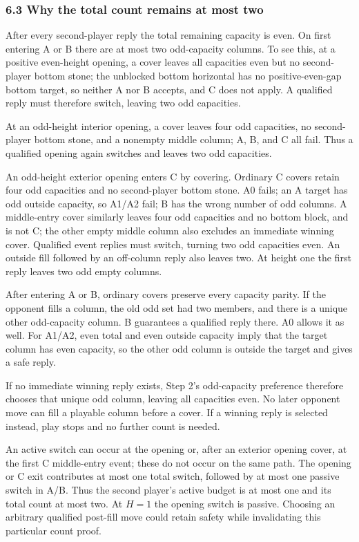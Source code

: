 \documentclass[
  a4paper,
]{article}
\newcounter{none} %
\begin{document}
\subsubsection{6.3 Why the total count remains at most
two}\label{why-the-total-count-remains-at-most-two}

After every second-player reply the total remaining capacity is even. On
first entering A or B there are at most two odd-capacity columns. To see
this, at a positive even-height opening, a cover leaves all capacities
even but no second-player bottom stone; the unblocked bottom horizontal
has no positive-even-gap bottom target, so neither A nor B accepts, and
C does not apply. A qualified reply must therefore switch, leaving two
odd capacities.

At an odd-height interior opening, a cover leaves four odd capacities,
no second-player bottom stone, and a nonempty middle column; A, B, and C
all fail. Thus a qualified opening again switches and leaves two odd
capacities.

An odd-height exterior opening enters C by covering. Ordinary C covers
retain four odd capacities and no second-player bottom stone. A0 fails;
an A target has odd outside capacity, so A1/A2 fail; B has the wrong
number of odd columns. A middle-entry cover similarly leaves four odd
capacities and no bottom block, and is not C; the other empty middle
column also excludes an immediate winning cover. Qualified event replies
must switch, turning two odd capacities even. An outside fill followed
by an off-column reply also leaves two. At height one the first reply
leaves two odd empty columns.

After entering A or B, ordinary covers preserve every capacity parity.
If the opponent fills a column, the old odd set had two members, and
there is a unique other odd-capacity column. B guarantees a qualified
reply there. A0 allows it as well. For A1/A2, even total and even
outside capacity imply that the target column has even capacity, so the
other odd column is outside the target and gives a safe reply.

If no immediate winning reply exists, Step 2's odd-capacity preference
therefore chooses that unique odd column, leaving all capacities even.
No later opponent move can fill a playable column before a cover. If a
winning reply is selected instead, play stops and no further count is
needed.

An active switch can occur at the opening or, after an exterior opening
cover, at the first C middle-entry event; these do not occur on the same
path. The opening or C exit contributes at most one total switch,
followed by at most one passive switch in A/B. Thus the second player's
active budget is at most one and its total count at most two. At \(H=1\)
the opening switch is passive. Choosing an arbitrary qualified post-fill
move could retain safety while invalidating this particular count proof.
\end{document}
